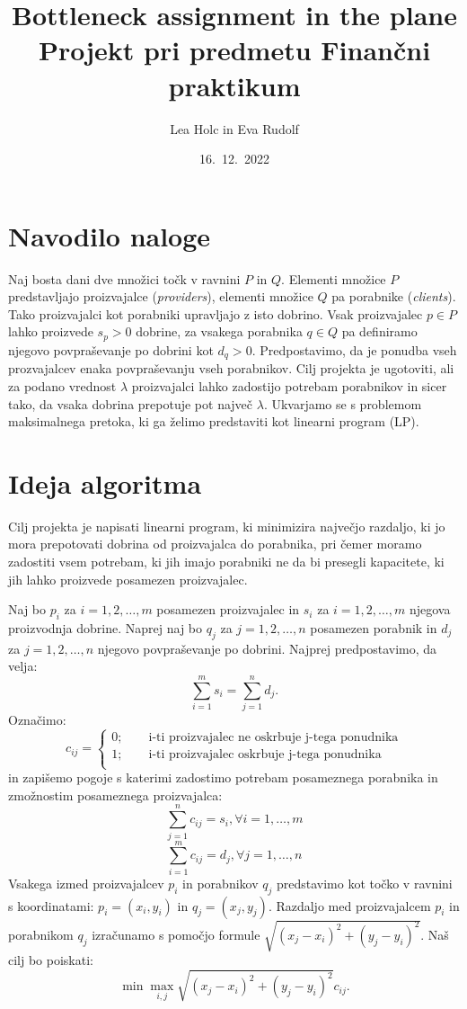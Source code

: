 \documentclass[a4paper, pt14]{article}
\begin{document}
\title{%
  Bottleneck assignment in the plane \\
  \large Projekt pri predmetu Finančni praktikum}
\author{Lea Holc in Eva Rudolf}
\date{16.\ 12.\ 2022}

\maketitle

\section{Navodilo naloge}
Naj bosta dani dve množici točk v ravnini $P$ in $Q$. Elementi množice $P$ predstavljajo proizvajalce (\textsl{providers}), elementi množice $Q$ pa porabnike (\textsl{clients}). Tako proizvajalci kot porabniki upravljajo z isto dobrino. Vsak proizvajalec $p \in P$ lahko proizvede $s_p > 0$ dobrine, za vsakega porabnika $q \in Q$ pa definiramo njegovo povpraševanje po dobrini kot $d_q > 0$. Predpostavimo, da je ponudba vseh prozvajalcev enaka povpraševanju vseh porabnikov. Cilj projekta je ugotoviti, ali za podano vrednost $\lambda$ proizvajalci lahko zadostijo potrebam porabnikov in sicer tako, da vsaka dobrina prepotuje pot največ $\lambda$. Ukvarjamo se s problemom maksimalnega pretoka, ki ga želimo predstaviti kot linearni program (LP).

\section{Ideja algoritma}
Cilj projekta je napisati linearni program, ki minimizira največjo razdaljo, ki jo mora prepotovati dobrina od proizvajalca do porabnika, pri čemer moramo zadostiti vsem potrebam, ki jih imajo porabniki ne da bi presegli kapacitete, ki jih lahko proizvede posamezen proizvajalec. 

Naj bo $p_i$ za $i=1,2,\dots,m$ posamezen proizvajalec in $s_i$ za $i=1,2,\dots,m$ njegova proizvodnja dobrine. Naprej naj bo $q_j$ za $j=1,2,\dots,n$ posamezen porabnik in $d_j$ za $j=1,2,\dots,n$ njegovo povpraševanje po dobrini. Najprej predpostavimo, da velja:
$$
\sum_{i=1}^m s_i = \sum_{j=1}^n d_j.
$$ 
Označimo: 
$$
c_{ij} = 
\begin{cases}
    0;\qquad \textrm{i-ti proizvajalec ne oskrbuje j-tega ponudnika} \\
    1;\qquad \textrm{i-ti proizvajalec oskrbuje j-tega ponudnika} \\
\end{cases} 
$$
in zapišemo pogoje s katerimi zadostimo potrebam posameznega porabnika in zmožnostim posameznega proizvajalca:
$$
\sum_{j=1}^n c_{ij} = s_i, \forall i = 1,\dots,m 
$$
$$
\sum_{i=1}^m c_{ij} = d_j, \forall j = 1,\dots,n 
$$
Vsakega izmed proizvajalcev $p_i$ in porabnikov $q_j$ predstavimo kot točko v ravnini s koordinatami: $p_i = (x_i,y_i)$ in $q_j = (x_j,y_j)$. Razdaljo med proizvajalcem $p_i$ in porabnikom $q_j$ izračunamo s pomočjo formule $\sqrt{(x_j-x_i)^2 + (y_j-y_i)^2}$. Naš cilj bo poiskati:
$$
\min \max_{i,j} \sqrt{(x_j-x_i)^2 + (y_j-y_i)^2}c_{ij}.
$$
\end{document}
